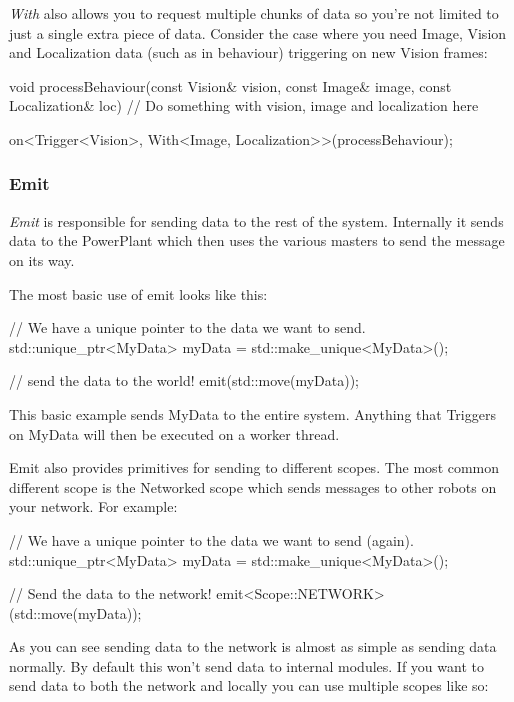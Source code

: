 \documentclass[english,12pt]{scrartcl}
\begin{document}
				\emph{With} also allows you to request multiple chunks of data so you're not limited to just a single extra piece of data.
				Consider the case where you need Image, Vision and Localization data (such as in behaviour) triggering on new Vision frames:
				
				\begin{cppcode}
					void processBehaviour(const Vision& vision, const Image& image, 
					    const Localization& loc) {
					    // Do something with vision, image and localization here
					}
					
					on<Trigger<Vision>, With<Image, Localization>>(processBehaviour);
				\end{cppcode}
				
			\subsubsection{Emit}
				\emph{Emit} is responsible for sending data to the rest of the system.
				Internally it sends data to the PowerPlant which then uses the various masters to send the message on its way.
				
				The most basic use of emit looks like this:
				
				\begin{cppcode}
					// We have a unique pointer to the data we want to send.
					std::unique_ptr<MyData> myData = std::make_unique<MyData>();
					
					// send the data to the world!
					emit(std::move(myData));
				\end{cppcode}
				
				This basic example sends MyData to the entire system.
				Anything that Triggers on MyData will then be executed on a worker thread.
				
				Emit also provides primitives for sending to different scopes.
				The most common different scope is the Networked scope which sends messages to other robots on your network.
				For example:
				
				\begin{cppcode}
					// We have a unique pointer to the data we want to send (again).
					std::unique_ptr<MyData> myData = std::make_unique<MyData>();
					
					// Send the data to the network!
					emit<Scope::NETWORK>(std::move(myData));
				\end{cppcode}
				
				As you can see sending data to the network is almost as simple as sending data normally.
				By default this won't send data to internal modules. 
				If you want to send data to both the network and locally you can use multiple scopes like so:
				
\end{document}
